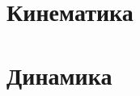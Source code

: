 




% 
% 

\newpage

\section{Кинематика}






\section{Динамика}
\setcounter{subsection}{4}
% 
% 



% 
% 

%   
% 
